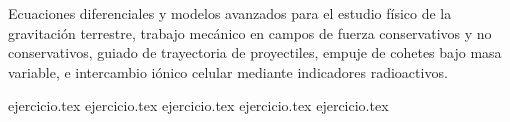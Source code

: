 
Ecuaciones diferenciales y modelos avanzados para el estudio físico de la gravitación terrestre, trabajo mecánico en campos de fuerza conservativos y no conservativos, guiado de trayectoria de proyectiles, empuje de cohetes bajo masa variable, e intercambio iónico celular mediante indicadores radioactivos.

\begin{enumerate}
    {ejercicio.tex}
    {ejercicio.tex}
    {ejercicio.tex}
    {ejercicio.tex}
    {ejercicio.tex}
\end{enumerate}
